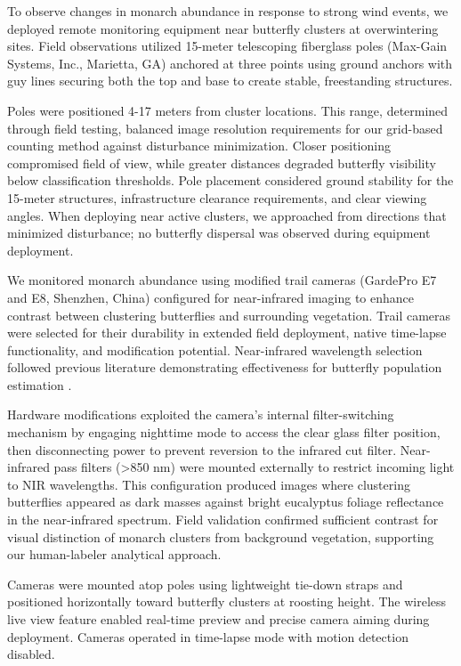 To observe changes in monarch abundance in response to strong wind events, we deployed remote monitoring equipment near butterfly clusters at overwintering sites. Field observations utilized 15-meter telescoping fiberglass poles (Max-Gain Systems, Inc., Marietta, GA) anchored at three points using ground anchors with guy lines securing both the top and base to create stable, freestanding structures. 

Poles were positioned 4-17 meters from cluster locations. This range, determined through field testing, balanced image resolution requirements for our grid-based counting method against disturbance minimization. Closer positioning compromised field of view, while greater distances degraded butterfly visibility below classification thresholds. Pole placement considered ground stability for the 15-meter structures, infrastructure clearance requirements, and clear viewing angles. When deploying near active clusters, we approached from directions that minimized disturbance; no butterfly dispersal was observed during equipment deployment. 

We monitored monarch abundance using modified trail cameras (GardePro E7 and E8, Shenzhen, China) configured for near-infrared imaging to enhance contrast between clustering butterflies and surrounding vegetation. Trail cameras were selected for their durability in extended field deployment, native time-lapse functionality, and modification potential. Near-infrared wavelength selection followed previous literature demonstrating effectiveness for butterfly population estimation \autocite{hristov_estimating_2019}. 

Hardware modifications exploited the camera's internal filter-switching mechanism by engaging nighttime mode to access the clear glass filter position, then disconnecting power to prevent reversion to the infrared cut filter. Near-infrared pass filters (>850 nm) were mounted externally to restrict incoming light to NIR wavelengths. This configuration produced images where clustering butterflies appeared as dark masses against bright eucalyptus foliage reflectance in the near-infrared spectrum. Field validation confirmed sufficient contrast for visual distinction of monarch clusters from background vegetation, supporting our human-labeler analytical approach.

Cameras were mounted atop poles using lightweight tie-down straps and positioned horizontally toward butterfly clusters at roosting height. The wireless live view feature enabled real-time preview and precise camera aiming during deployment. Cameras operated in time-lapse mode with motion detection disabled. 

